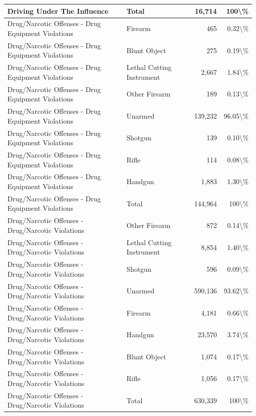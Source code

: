 \documentclass[
]{krantz}
\begin{document}
\begin{longtable}[t]{l|l|r|r}
\hline
Driving Under The Influence & Total & 16,714 & 100\textbackslash{}\%\\
\hline
Drug/Narcotic Offenses - Drug Equipment Violations & Firearm & 465 & 0.32\textbackslash{}\%\\
\hline
Drug/Narcotic Offenses - Drug Equipment Violations & Blunt Object & 275 & 0.19\textbackslash{}\%\\
\hline
Drug/Narcotic Offenses - Drug Equipment Violations & Lethal Cutting Instrument & 2,667 & 1.84\textbackslash{}\%\\
\hline
Drug/Narcotic Offenses - Drug Equipment Violations & Other Firearm & 189 & 0.13\textbackslash{}\%\\
\hline
Drug/Narcotic Offenses - Drug Equipment Violations & Unarmed & 139,232 & 96.05\textbackslash{}\%\\
\hline
Drug/Narcotic Offenses - Drug Equipment Violations & Shotgun & 139 & 0.10\textbackslash{}\%\\
\hline
Drug/Narcotic Offenses - Drug Equipment Violations & Rifle & 114 & 0.08\textbackslash{}\%\\
\hline
Drug/Narcotic Offenses - Drug Equipment Violations & Handgun & 1,883 & 1.30\textbackslash{}\%\\
\hline
Drug/Narcotic Offenses - Drug Equipment Violations & Total & 144,964 & 100\textbackslash{}\%\\
\hline
Drug/Narcotic Offenses - Drug/Narcotic Violations & Other Firearm & 872 & 0.14\textbackslash{}\%\\
\hline
Drug/Narcotic Offenses - Drug/Narcotic Violations & Lethal Cutting Instrument & 8,854 & 1.40\textbackslash{}\%\\
\hline
Drug/Narcotic Offenses - Drug/Narcotic Violations & Shotgun & 596 & 0.09\textbackslash{}\%\\
\hline
Drug/Narcotic Offenses - Drug/Narcotic Violations & Unarmed & 590,136 & 93.62\textbackslash{}\%\\
\hline
Drug/Narcotic Offenses - Drug/Narcotic Violations & Firearm & 4,181 & 0.66\textbackslash{}\%\\
\hline
Drug/Narcotic Offenses - Drug/Narcotic Violations & Handgun & 23,570 & 3.74\textbackslash{}\%\\
\hline
Drug/Narcotic Offenses - Drug/Narcotic Violations & Blunt Object & 1,074 & 0.17\textbackslash{}\%\\
\hline
Drug/Narcotic Offenses - Drug/Narcotic Violations & Rifle & 1,056 & 0.17\textbackslash{}\%\\
\hline
Drug/Narcotic Offenses - Drug/Narcotic Violations & Total & 630,339 & 100\textbackslash{}\%\\

\end{longtable}
\end{document}
